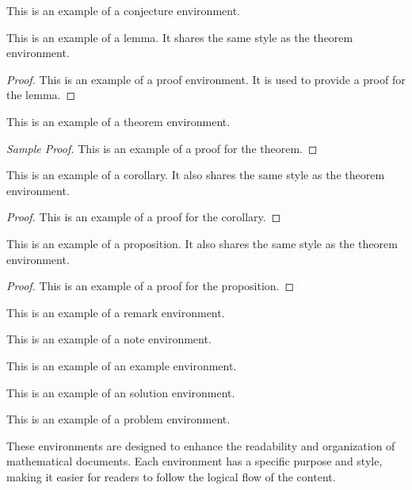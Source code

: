 \begin{conjecture}
  This is an example of a conjecture environment.
\end{conjecture}

\begin{lemma}
  This is an example of a lemma. It shares the same style as the theorem environment.
\end{lemma}
\begin{proof}
  This is an example of a proof environment. It is used to provide a proof for the lemma.
\end{proof}

\begin{theorem}
  This is an example of a theorem environment. 
\end{theorem}
\begin{proof}[Sample Proof]
  This is an example of a proof for the theorem.
\end{proof}

\begin{corollary}
  This is an example of a corollary. It also shares the same style as the theorem environment.
\end{corollary}
\begin{proof}
  This is an example of a proof for the corollary.
\end{proof}

\begin{proposition}
  This is an example of a proposition. It also shares the same style as the theorem environment.
\end{proposition}
\begin{proof}
  This is an example of a proof for the proposition.
\end{proof}

\begin{remark}
  This is an example of a remark environment.
\end{remark}

\begin{note}
  This is an example of a note environment.
\end{note}

\begin{example}
  This is an example of an example environment.
\end{example}

\begin{solution}
  This is an example of an solution environment.
\end{solution}

\begin{problem}
  This is an example of a problem environment.
\end{problem}

These environments are designed to enhance the readability and organization of mathematical documents. 
Each environment has a specific purpose and style, making it easier for readers to follow the logical flow of the content.